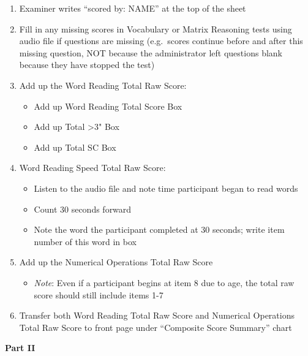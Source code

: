 \documentclass[]{book}
\providecommand{\tightlist}{%
  \setlength{\itemsep}{0pt}\setlength{\parskip}{0pt}}
\begin{document}
\begin{enumerate}
\def\labelenumi{\arabic{enumi}.}
\tightlist
\item
  Examiner writes ``scored by: NAME'' at the top of the sheet
\item
  Fill in any missing scores in Vocabulary or Matrix Reasoning tests using audio file if questions are missing (e.g.~scores continue before and after this missing question, NOT because the administrator left questions blank because they have stopped the test)
\item
  Add up the Word Reading Total Raw Score:

  \begin{itemize}
  \tightlist
  \item
    Add up Word Reading Total Score Box
  \item
    Add up Total \textgreater{}3" Box
  \item
    Add up Total SC Box
  \end{itemize}
\item
  Word Reading Speed Total Raw Score:

  \begin{itemize}
  \tightlist
  \item
    Listen to the audio file and note time participant began to read words
  \item
    Count 30 seconds forward
  \item
    Note the word the participant completed at 30 seconds; write item number of this word in box
  \end{itemize}
\item
  Add up the Numerical Operations Total Raw Score

  \begin{itemize}
  \tightlist
  \item
    \emph{Note}: Even if a participant begins at item 8 due to age, the total raw score should still include items 1-7
  \end{itemize}
\item
  Transfer both Word Reading Total Raw Score and Numerical Operations Total Raw Score to front page under ``Composite Score Summary'' chart
\end{enumerate}

\textbf{Part II}
\end{document}

